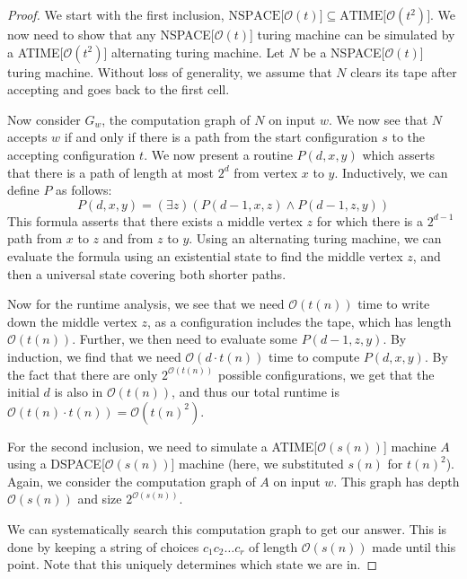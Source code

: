 \begin{proof}
    We start with the first inclusion, $\text{NSPACE[$\mathcal{O}(t)$]} \subseteq \text{ATIME[$\mathcal{O}(t^2)$]}$.
    We now need to show that any NSPACE[$\mathcal{O}(t)$] turing machine can be simulated by a ATIME[$\mathcal{O}(t^2)$] alternating turing machine.
    Let $N$ be a NSPACE[$\mathcal{O}(t)$] turing machine.
    Without loss of generality, we assume that $N$ clears its tape after accepting and goes back to the first cell.

    Now consider $G_w$, the computation graph of $N$ on input $w$.
    We now see that $N$ accepts $w$ if and only if there is a path from the start configuration $s$ to the accepting configuration $t$.
    We now present a routine $P(d, x, y)$ which asserts that there is a path of length at most $2^{d}$ from vertex $x$ to $y$.
    Inductively, we can define $P$ as follows:
    \[
        P(d, x, y) = (\exists z)(P(d - 1, x, z) \land P(d - 1, z, y))
    \]
    This formula asserts that there exists a middle vertex $z$ for which there is a $2^{d - 1}$ path from $x$ to $z$ and from $z$ to $y$.
    Using an alternating turing machine, we can evaluate the formula using an existential state to find the middle vertex $z$, and then a universal state covering both shorter paths.

    Now for the runtime analysis, we see that we need $\mathcal{O}(t(n))$ time to write down the middle vertex $z$, as a configuration includes the tape, which has length $\mathcal{O}(t(n))$.
    Further, we then need to evaluate some $P(d - 1, z, y)$.
    By induction, we find that we need $\mathcal{O}(d\cdot t(n))$ time to compute $P(d, x, y)$.
    By the fact that there are only $2^{\mathcal{O}(t(n))}$ possible configurations, we get that the initial $d$ is also in $\mathcal{O}(t(n))$, and thus our total runtime is $\mathcal{O}(t(n)\cdot t(n)) = \mathcal{O}(t(n)^2)$.

    For the second inclusion, we need to simulate a ATIME[$\mathcal{O}(s(n))$] machine $A$ using a DSPACE[$\mathcal{O}(s(n))$] machine (here, we substituted $s(n)$ for $t(n)^2$).
    Again, we consider the computation graph of $A$ on input $w$.
    This graph has depth $\mathcal{O}(s(n))$ and size $2^{\mathcal{O}(s(n))}$.

    We can systematically search this computation graph to get our answer.
    This is done by keeping a string of choices $c_{1}c_{2}\dots c_r$ of length $\mathcal{O}(s(n))$ made until this point.
    Note that this uniquely determines which state we are in.


\end{proof}

